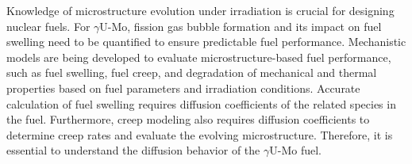 \documentclass{elsarticle}
\providecommand{\DIFadd}[1]{{\protect\color{blue} \sf #1}} %
\providecommand{\DIFdel}[1]{}
\providecommand{\DIFaddbegin}{} %
\providecommand{\DIFaddend}{} %
\providecommand{\DIFdelbegin}{} %
\providecommand{\DIFdelend}{} %
\begin{document}
Knowledge of microstructure evolution under irradiation is crucial for designing nuclear fuels. For $\gamma$U-Mo, fission gas bubble formation and its impact on fuel swelling need to be quantified to ensure predictable fuel performance. Mechanistic models are being developed to evaluate microstructure-based fuel performance, \DIFdelbegin \DIFdel{including fission gas swelling based on fuel parameters and irradiation conditions}\DIFdelend \DIFaddbegin \DIFadd{such as fuel swelling}\DIFaddend , fuel creep, and degradation of mechanical and thermal properties \DIFaddbegin \DIFadd{based on fuel parameters and irradiation conditions}\DIFaddend . Accurate calculation of \DIFdelbegin \DIFdel{fission gas }\DIFdelend \DIFaddbegin \DIFadd{fuel }\DIFaddend swelling requires diffusion coefficients of the related species in the fuel. Furthermore, creep modeling also requires diffusion coefficients to \DIFdelbegin \DIFdel{both }\DIFdelend \DIFaddbegin \DIFadd{determine creep rates and }\DIFaddend evaluate the evolving microstructure\DIFdelbegin \DIFdel{and determine creep mechanisms}\DIFdelend . Therefore, it is essential to understand the diffusion behavior of the $\gamma$U-Mo fuel.
\end{document}
